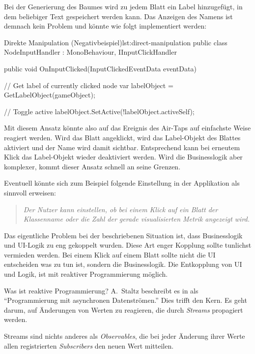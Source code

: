 Bei der Generierung des Baumes wird zu jedem Blatt ein Label hinzugefügt, in dem beliebiger Text gespeichert werden kann. Das Anzeigen des Namens ist demnach kein Problem und könnte wie folgt implementiert werden:

\begin{codesnippet}{Direkte Manipulation (Negativbeispiel)}{lst:direct-manipulation}
public class NodeInputHandler : MonoBehaviour, IInputClickHandler
{
    public void OnInputClicked(InputClickedEventData eventData)
    {
        // Get label of currently clicked node
        var labelObject = GetLabelObject(gameObject);

        // Toggle active
        labelObject.SetActive(!labelObject.activeSelf);
    }
}
\end{codesnippet}

Mit diesem Ansatz könnte also auf das Ereignis des Air-Taps auf einfachste Weise reagiert werden. Wird das Blatt angeklickt, wird das Label-Objekt des Blattes aktiviert und der Name wird damit sichtbar. Entsprechend kann bei erneutem Klick das Label-Objekt wieder deaktiviert werden. Wird die Businesslogik aber komplexer, kommt dieser Ansatz schnell an seine Grenzen.

Eventuell könnte sich zum Beispiel folgende Einstellung in der Applikation als sinnvoll erweisen:

\begin{quotation}
  \textit{Der Nutzer kann einstellen, ob bei einem Klick auf ein Blatt der Klassenname oder die Zahl der gerade visualisierten Metrik angezeigt wird.}
\end{quotation}

Das eigentliche Problem bei der beschriebenen Situation ist, dass Businesslogik und UI-Logik zu eng gekoppelt wurden. Diese Art enger Kopplung sollte tunlichst vermieden werden. Bei einem Klick auf einem Blatt sollte nicht die UI entscheiden was zu tun ist, sondern die Businesslogik. Die Entkopplung von UI und Logik, ist mit reaktiver Programmierung möglich.

Was ist reaktive Programmierung? A.\ Staltz beschreibt es in \cite{staltz2016introduction} als "`Programmierung mit asynchronen Datenströmen."' Dies trifft den Kern. Es geht darum, auf Änderungen von Werten zu reagieren, die durch \textit{Streams} propagiert werden.

Streams sind nichts anderes als \textit{Observables}, die bei jeder Änderung ihrer Werte allen registrierten \textit{Subscribers} den neuen Wert mitteilen.

